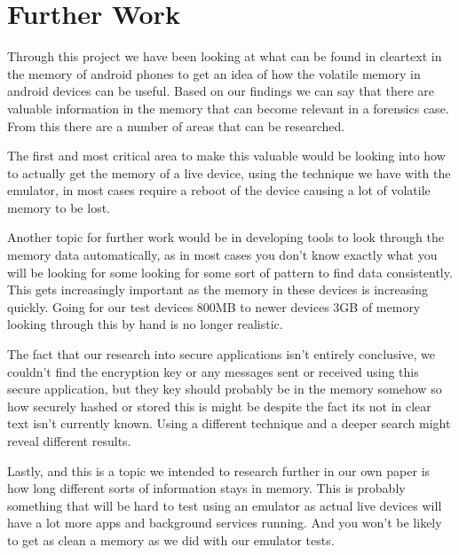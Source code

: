 \section{Further Work}
Through this project we have been looking at what can be found in cleartext in 
the memory of android phones to get an idea of how the volatile memory in 
android devices  can be useful. Based on our findings we can say that there are
valuable information in the memory that can become relevant in a forensics case. 
From this there are a number of areas that can be researched.

The first and most critical area to make this valuable would be looking into how 
to actually get the memory of a live device, using the technique we have with 
the emulator, in most cases require a reboot of the device causing a lot of 
volatile memory to be lost.

Another topic for further work would be in developing tools to look through the 
memory data automatically, as in most cases you don't know exactly what you will 
be looking for some looking for some sort of pattern to find data consistently. 
This gets increasingly important as the memory in these devices is increasing 
quickly. Going for our test devices 800MB to newer devices 3GB of memory looking 
through this by hand is no longer realistic.

The fact that our research into secure applications isn't entirely conclusive, we
couldn't find the encryption  key or any messages sent or received using this 
secure application, but they key should probably be in the memory somehow so how 
securely hashed or stored this is might be despite the fact its not in clear text 
isn't currently known. Using a different technique and a deeper search might 
reveal different results.  

Lastly, and this is a topic we intended to research further in our own paper is 
how long different sorts of information stays in memory. This is probably 
something that will be hard to test using an emulator as actual live devices will 
have a lot more apps and background services running. And you won't be likely to 
get as clean a memory as we did with our emulator tests. 
